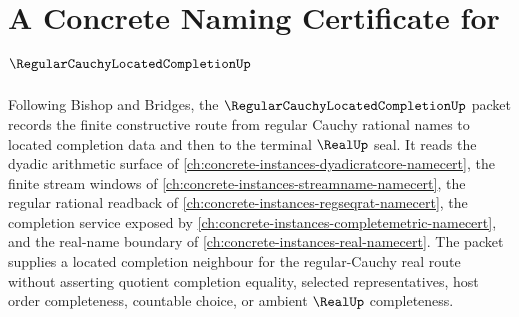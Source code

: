 \chapter{A Concrete Naming Certificate for $\RegularCauchyLocatedCompletionUp$}
\label{ch:concrete-instances-regular-cauchy-located-completion-namecert}

Following Bishop and Bridges, the $\RegularCauchyLocatedCompletionUp$ packet records the finite constructive route from regular Cauchy rational names to located completion data and then to the terminal $\RealUp$ seal. It reads the dyadic arithmetic surface of \autoref{ch:concrete-instances-dyadicratcore-namecert}, the finite stream windows of \autoref{ch:concrete-instances-streamname-namecert}, the regular rational readback of \autoref{ch:concrete-instances-regseqrat-namecert}, the completion service exposed by \autoref{ch:concrete-instances-completemetric-namecert}, and the real-name boundary of \autoref{ch:concrete-instances-real-namecert}. The packet supplies a located completion neighbour for the regular-Cauchy real route without asserting quotient completion equality, selected representatives, host order completeness, countable choice, or ambient $\RealUp$ completeness.

